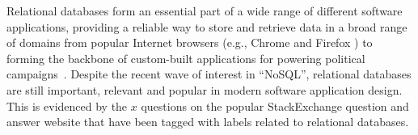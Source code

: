 %
%
%
%


Relational databases form an essential part of a wide range of different software applications, providing a reliable way to store and retrieve data in a broad range of domains from popular Internet browsers (e.g., Chrome \cite{} and Firefox \cite{}) to forming the backbone of custom-built applications for powering political campaigns~\cite{Butler2012}. Despite the recent wave of interest in ``NoSQL'', relational databases are still important, relevant and popular in modern software application design. This is evidenced by the $x$ questions on the popular StackExchange question and answer website that have been tagged with labels related to relational databases.




